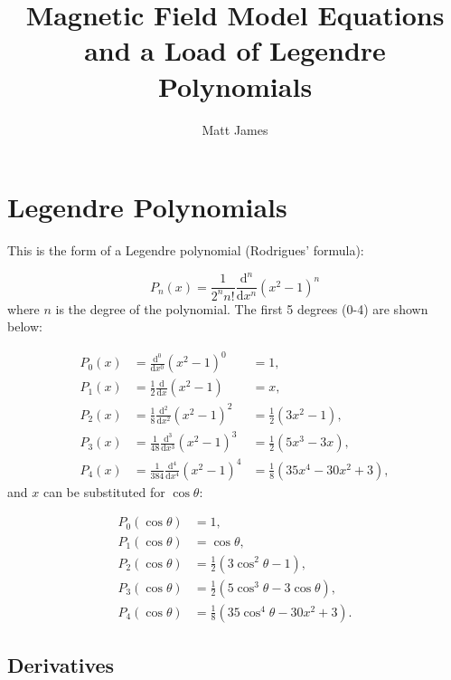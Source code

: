 \documentclass[]{article}
\title{Magnetic Field Model Equations and a Load of Legendre Polynomials}
\author{Matt James}
\begin{document}
\maketitle


\section{Legendre Polynomials}

	This is the form of a Legendre polynomial (Rodrigues' formula):
	
	\begin{equation}
		P_n(x) = \frac{1}{2^n n!}\frac{\text{d}^n}{\text{d}x^n}(x^2 - 1)^n \label{EqLegendre}
	\end{equation}
	where $n$ is the degree of the polynomial. The first 5 degrees (0-4) are shown below:
	
	\begin{align}
		P_0(x) &= \frac{\text{d}^0}{\text{d}x^0} (x^2 - 1)^0 &= 1, \label{EqP0} \\
		P_1(x) &= \frac{1}{2} \frac{\text{d}}{\text{d}x} (x^2 - 1) &= x, \label{EqP1} \\
		P_2(x) &= \frac{1}{8} \frac{\text{d}^2}{\text{d}x^2} (x^2 - 1)^2 &= \frac{1}{2}(3x^2 - 1), \label{EqP2} \\
		P_3(x) &= \frac{1}{48} \frac{\text{d}^3}{\text{d}x^3} (x^2 - 1)^3 &= \frac{1}{2}(5x^3 - 3x), \label{EqP3} \\
		P_4(x) &= \frac{1}{384} \frac{\text{d}^4}{\text{d}x^4} (x^2 - 1)^4 &= \frac{1}{8}(35x^4 - 30x^2 + 3), \label{EqP4}
	\end{align}
 	and $x$ can be substituted for $\cos{\theta}$:
	
	\begin{align}
		P_0(\cos{\theta}) &= 1 \label{EqP0t}, \\
		P_1(\cos{\theta}) &= \cos{\theta}, \label{EqP1t} \\
		P_2(\cos{\theta}) &= \frac{1}{2}(3\cos^2{\theta} - 1 \label{EqP2t}), \\
		P_3(\cos{\theta}) &= \frac{1}{2}(5\cos^3{\theta} - 3\cos{\theta}), \label{EqP3t} \\
		P_4(\cos{\theta}) &= \frac{1}{8}(35\cos^4{\theta} - 30x^2 + 3). \label{EqP4t}		
	\end{align}
	
	\subsection{Derivatives}
		
\end{document}
